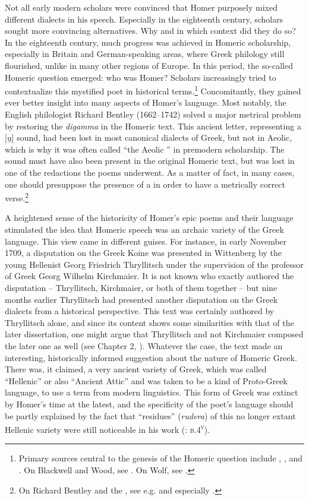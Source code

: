 Not all early modern scholars were convinced that Homer purposely mixed different dialects in his speech. Especially in the eighteenth century, scholars sought more convincing alternatives. Why and in which context did they do so? In the eighteenth century, much progress was achieved in Homeric scholarship, especially in Britain and German-speaking areas, where Greek philology still flourished, unlike in many other regions of Europe. In this period, the so-called Homeric question emerged: who was Homer? Scholars increasingly tried to contextualize this mystified poet in historical terms.\footnote{Primary sources central to the genesis of the Homeric question include \citet[]{[blackwell]1735}, \citet{Wood1775}, and \citet{Wolf1795}. On Blackwell and Wood, see \citet[90--108]{Bauman2003}. On Wolf, see \citet[55–57]{Sandys_history_1908-1}.} Concomitantly, they gained ever better insight into many aspects of Homer’s language. Most notably, the English philologist Richard Bentley (1662–1742) solved a major metrical problem by restoring the \textit{digamma} in the Homeric text. This ancient letter, representing a [u̯] sound, had been lost in most canonical dialects of Greek, but not in Aeolic, which is why it was often called “the Aeolic ” in premodern scholarship. The sound must have also been present in the original Homeric text, but was lost in one of the redactions the poems underwent. As a matter of fact, in many cases, one should presuppose the presence of a  in order to have a metrically correct verse.\footnote{On Richard Bentley and the , see e.g. \citet[407]{Sandys1908} and especially \citet[182--186]{Haugen2011}.}

A heightened sense of the historicity of Homer’s epic poems and their language stimulated the idea that Homeric speech was an archaic variety of the Greek language. This view came in different guises. For instance, in early November 1709, a disputation on the Greek Koine was presented in Wittenberg by the young Hellenist Georg Friedrich Thryllitsch under the supervision of the professor of Greek Georg Wilhelm Kirchmaier. It is not known who exactly authored the disputation – Thryllitsch, Kirchmaier, or both of them together – but nine months earlier Thryllitsch had presented another disputation on the Greek dialects from a historical perspective. This text was certainly authored by Thryllitsch alone, and since its content shows some similarities with that of the later dissertation, one might argue that Thryllitsch and not Kirchmaier composed the later one as well (see Chapter 2, ). Whatever the case, the text made an interesting, historically informed suggestion about the nature of Homeric Greek. There was, it claimed, a very ancient variety of Greek, which was called “Hellenic” or also “Ancient Attic” and was taken to be a kind of Proto-Greek language, to use a term from modern linguistics. This form of Greek was extinct by Homer’s time at the latest, and the specificity of the poet’s language should be partly explained by the fact that “residues” (\textit{rudera}) of this no longer extant Hellenic variety were still noticeable in his work (\citealt{Kirchmaier1709}: \textsc{b.4}\textsc{\textsuperscript{v}}).

